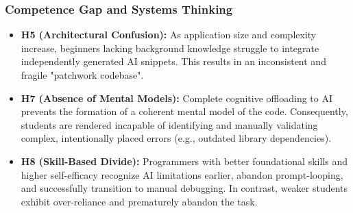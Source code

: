 \documentclass[../tanulmany.tex]{subfiles}
\begin{document}
\subsubsection{Competence Gap and Systems Thinking}

  \begin{itemize}
      \item \textbf{H5 (Architectural Confusion):}
           As application size and complexity increase, beginners lacking background knowledge struggle to integrate independently generated AI snippets.
           This results in an inconsistent and fragile "patchwork codebase".

      \item \textbf{H7 (Absence of Mental Models):}
          Complete cognitive offloading to AI prevents the formation of a coherent mental model of the code.
          Consequently, students are rendered incapable of identifying and manually validating complex, intentionally placed errors (e.g., outdated library dependencies).

      \item \textbf{H8 (Skill-Based Divide):}
          Programmers with better foundational skills and higher self-efficacy recognize AI limitations earlier, abandon prompt-looping, and successfully transition to manual debugging.
          In contrast, weaker students exhibit over-reliance and prematurely abandon the task.
  \end{itemize}
\end{document}
